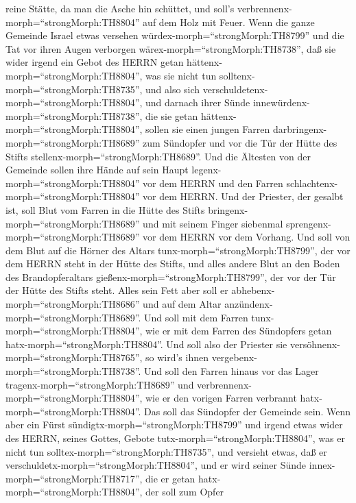 reine Stätte, da man die Asche hin schüttet, und soll's
verbrennenx-morph=``strongMorph:TH8804'' auf dem Holz mit Feuer.
 Wenn die ganze Gemeinde Israel etwas versehen
würdex-morph=``strongMorph:TH8799'' und die Tat vor ihren Augen
verborgen wärex-morph=``strongMorph:TH8738'', daß sie wider irgend ein
Gebot des HERRN getan hättenx-morph=``strongMorph:TH8804'', was sie
nicht tun solltenx-morph=``strongMorph:TH8735'', und also sich
verschuldetenx-morph=``strongMorph:TH8804'',  und darnach
ihrer Sünde innewürdenx-morph=``strongMorph:TH8738'', die sie getan
hättenx-morph=``strongMorph:TH8804'', sollen sie einen jungen Farren
darbringenx-morph=``strongMorph:TH8689'' zum Sündopfer und vor die Tür
der Hütte des Stifts stellenx-morph=``strongMorph:TH8689''.
 Und die Ältesten von der Gemeinde sollen ihre Hände auf
sein Haupt legenx-morph=``strongMorph:TH8804'' vor dem HERRN und den
Farren schlachtenx-morph=``strongMorph:TH8804'' vor dem HERRN.
 Und der Priester, der gesalbt ist, soll Blut vom Farren in
die Hütte des Stifts bringenx-morph=``strongMorph:TH8689'' 
und mit seinem Finger siebenmal sprengenx-morph=``strongMorph:TH8689''
vor dem HERRN vor dem Vorhang.  Und soll von dem Blut auf
die Hörner des Altars tunx-morph=``strongMorph:TH8799'', der vor dem
HERRN steht in der Hütte des Stifts, und alles andere Blut an den Boden
des Brandopferaltars gießenx-morph=``strongMorph:TH8799'', der vor der
Tür der Hütte des Stifts steht.  Alles sein Fett aber soll
er abhebenx-morph=``strongMorph:TH8686'' und auf dem Altar
anzündenx-morph=``strongMorph:TH8689''.  Und soll mit dem
Farren tunx-morph=``strongMorph:TH8804'', wie er mit dem Farren des
Sündopfers getan hatx-morph=``strongMorph:TH8804''. Und soll also der
Priester sie versöhnenx-morph=``strongMorph:TH8765'', so wird's ihnen
vergebenx-morph=``strongMorph:TH8738''.  Und soll den
Farren hinaus vor das Lager tragenx-morph=``strongMorph:TH8689'' und
verbrennenx-morph=``strongMorph:TH8804'', wie er den vorigen Farren
verbrannt hatx-morph=``strongMorph:TH8804''. Das soll das Sündopfer der
Gemeinde sein.  Wenn aber ein Fürst
sündigtx-morph=``strongMorph:TH8799'' und irgend etwas wider des HERRN,
seines Gottes, Gebote tutx-morph=``strongMorph:TH8804'', was er nicht
tun solltex-morph=``strongMorph:TH8735'', und versieht etwas, daß er
verschuldetx-morph=``strongMorph:TH8804'',  und er wird
seiner Sünde innex-morph=``strongMorph:TH8717'', die er getan
hatx-morph=``strongMorph:TH8804'', der soll zum Opfer
